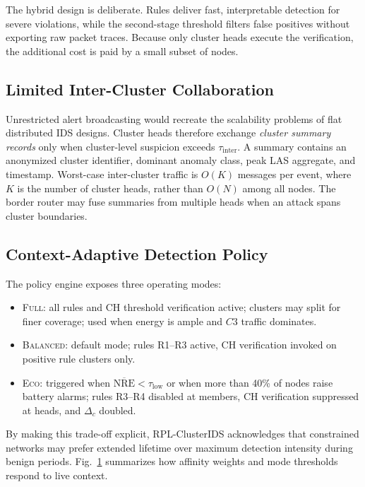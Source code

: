 The hybrid design is deliberate.
Rules deliver fast, interpretable detection for severe violations, while the second-stage threshold filters false positives without exporting raw packet traces.
Because only cluster heads execute the verification, the additional cost is paid by a small subset of nodes.

\subsection{Limited Inter-Cluster Collaboration}
Unrestricted alert broadcasting would recreate the scalability problems of flat distributed IDS designs.
Cluster heads therefore exchange \emph{cluster summary records} only when cluster-level suspicion exceeds $\tau_{\mathrm{inter}}$.
A summary contains an anonymized cluster identifier, dominant anomaly class, peak LAS aggregate, and timestamp.
Worst-case inter-cluster traffic is $O(K)$ messages per event, where $K$ is the number of cluster heads, rather than $O(N)$ among all nodes.
The border router may fuse summaries from multiple heads when an attack spans cluster boundaries.

\subsection{Context-Adaptive Detection Policy}
The policy engine exposes three operating modes:
\begin{itemize}
  \item \textsc{Full}: all rules and CH threshold verification active; clusters may split for finer coverage; used when energy is ample and $C3$ traffic dominates.
  \item \textsc{Balanced}: default mode; rules R1--R3 active, CH verification invoked on positive rule clusters only.
  \item \textsc{Eco}: triggered when $\overline{\mathrm{NRE}}<\tau_{\mathrm{low}}$ or when more than 40\% of nodes raise battery alarms; rules R3--R4 disabled at members, CH verification suppressed at heads, and $\Delta_c$ doubled.
\end{itemize}
By making this trade-off explicit, RPL-ClusterIDS acknowledges that constrained networks may prefer extended lifetime over maximum detection intensity during benign periods.
Fig.~\ref{fig:policy-weights} summarizes how affinity weights and mode thresholds respond to live context.

\begin{figure}[!t]
  \centering
  \resizebox{\linewidth}{!}{}
  \caption{\CaptionFigThree}
  \label{fig:policy-weights}
\end{figure}

